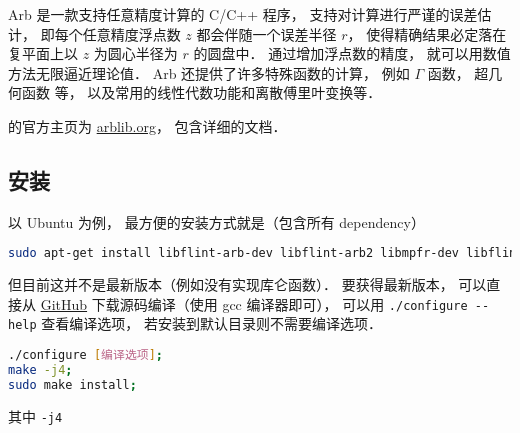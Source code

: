 
Arb 是一款支持任意精度计算的 C/C++ 程序， 支持对计算进行严谨的误差估计， 即每个任意精度浮点数 $z$ 都会伴随一个误差半径 $r$， 使得精确结果必定落在复平面上以 $z$ 为圆心半径为 $r$ 的圆盘中． 通过增加浮点数的精度， 就可以用数值方法无限逼近理论值． Arb 还提供了许多特殊函数的计算， 例如 $\Gamma$ 函数， 超几何函数 等， 以及常用的线性代数功能和离散傅里叶变换等．

的官方主页为 \href{https://arblib.org/}{arblib.org}， 包含详细的文档．

\subsection{安装}
以 Ubuntu 为例， 最方便的安装方式就是（包含所有 dependency）
\begin{lstlisting}[language=bash]
sudo apt-get install libflint-arb-dev libflint-arb2 libmpfr-dev libflint-dev
\end{lstlisting}
但目前这并不是最新版本（例如没有实现库仑函数）． 要获得最新版本， 可以直接从 \href{https://github.com/fredrik-johansson/arb/}{GitHub} 下载源码编译（使用 gcc 编译器即可）， 可以用 \verb|./configure --help| 查看编译选项， 若安装到默认目录则不需要编译选项．
\begin{lstlisting}[language=bash]
./configure [编译选项];
make -j4;
sudo make install;
\end{lstlisting}
其中 \verb|-j4|
